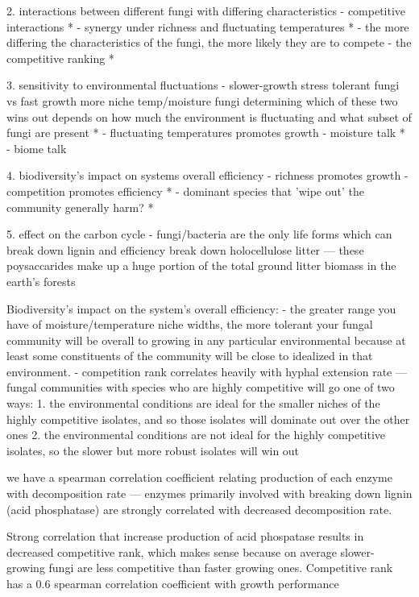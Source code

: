 \documentclass[12pt]{article}
\begin{document}
\begin{multicols}{2}
2. interactions between different fungi with differing characteristics
- competitive interactions *
- synergy under richness and fluctuating temperatures *
- the more differing the characteristics of the fungi, the more likely they are to compete
- the competitive ranking *

3. sensitivity to environmental fluctuations
- slower-growth stress tolerant fungi vs fast growth more niche temp/moisture fungi determining which of these two wins out depends on how much the environment is fluctuating and what subset of fungi are present *
- fluctuating temperatures promotes growth
- moisture talk *
- biome talk

4. biodiversity's impact on systems overall efficiency
- richness promotes growth
- competition promotes efficiency *
- dominant species that 'wipe out' the community generally harm? *

5. effect on the carbon cycle
- fungi/bacteria are the only life forms which can break down lignin and efficiency break down holocellulose litter — these poysaccarides make up a huge portion of the total ground litter biomass in the earth's forests

Biodiversity's impact on the system's overall efficiency:
- the greater range you have of moisture/temperature niche widths, the more tolerant your fungal community will be overall to growing in any particular environmental because at least some constituents of the community will be close to idealized in that environment.
- competition rank correlates heavily with hyphal extension rate — fungal communities with species who are highly competitive will go one of two ways: 1. the environmental conditions are ideal for the smaller niches of the highly competitive isolates, and so those isolates will dominate out over the other ones 2. the environmental conditions are not ideal for the highly competitive isolates, so the slower but more robust isolates will win out

we have a spearman correlation coefficient relating production of each enzyme with decomposition rate — enzymes primarily involved with breaking down lignin (acid phosphatase) are strongly correlated with decreased decomposition rate.

Strong correlation that increase production of acid phospatase results in decreased competitive rank, which makes sense because on average slower-growing fungi are less competitive than faster growing ones. Competitive rank has a 0.6 spearman correlation coefficient with growth performance


\end{multicols}
\end{document}
